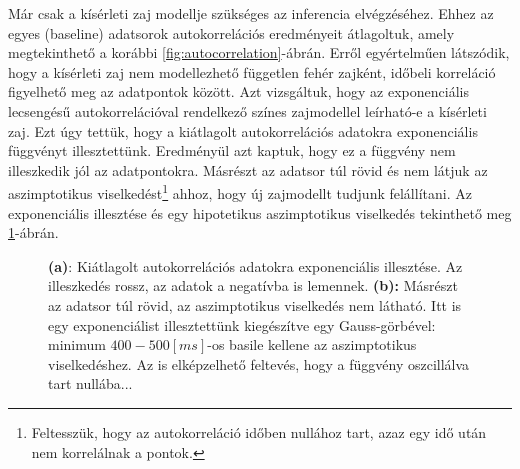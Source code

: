Már csak a kísérleti zaj modellje szükséges az inferencia elvégzéséhez. Ehhez az egyes (baseline) adatsorok autokorrelációs eredményeit átlagoltuk, amely megtekinthető a korábbi \ref{fig:autocorrelation}-ábrán. Erről egyértelműen látszódik, hogy a kísérleti zaj nem modellezhető független fehér zajként, időbeli korreláció figyelhető meg az adatpontok között. Azt vizsgáltuk, hogy az exponenciális lecsengésű autokorrelációval rendelkező színes zajmodellel leírható-e a kísérleti zaj. Ezt úgy tettük, hogy a kiátlagolt autokorrelációs adatokra exponenciális függvényt illesztettünk. Eredményül azt kaptuk, hogy ez a függvény nem illeszkedik jól az adatpontokra. Másrészt az adatsor túl rövid és nem látjuk az aszimptotikus viselkedést\footnote{Feltesszük, hogy az autokorreláció időben nullához tart, azaz egy idő után nem korrelálnak a pontok.} ahhoz, hogy új zajmodellt tudjunk felállítani. Az exponenciális illesztése és egy hipotetikus aszimptotikus viselkedés tekinthető meg \ref{fig:auto_fit}-ábrán.

\begin{figure}[h!]
	\centering
	\caption[Illesztés az autokorrelációs adatokra]{\textbf{(a)}: Kiátlagolt autokorrelációs adatokra exponenciális illesztése. Az illeszkedés rossz, az adatok a negatívba is lemennek. \textbf{(b):} Másrészt az adatsor túl rövid, az aszimptotikus viselkedés nem látható. Itt is egy exponenciálist illesztettünk kiegészítve egy Gauss-görbével: minimum $400-500 [ms]$-os basile kellene az aszimptotikus viselkedéshez. Az is elképzelhető feltevés, hogy a függvény oszcillálva tart nullába...}
	\label{fig:auto_fit}
\end{figure}

